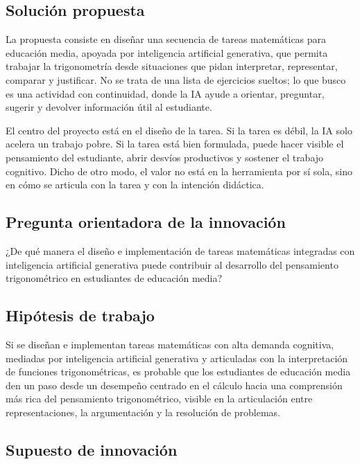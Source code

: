 \documentclass[11pt,spanish,letterpaper,openany]{book}
\begin{document}
\subsection{Solución propuesta}

La propuesta consiste en diseñar una secuencia de tareas matemáticas para educación media, apoyada por inteligencia artificial generativa, que permita trabajar la trigonometría desde situaciones que pidan interpretar, representar, comparar y justificar. No se trata de una lista de ejercicios sueltos; lo que busco es una actividad con continuidad, donde la IA ayude a orientar, preguntar, sugerir y devolver información útil al estudiante.

El centro del proyecto está en el diseño de la tarea. Si la tarea es débil, la IA solo acelera un trabajo pobre. Si la tarea está bien formulada, puede hacer visible el pensamiento del estudiante, abrir desvíos productivos y sostener el trabajo cognitivo. Dicho de otro modo, el valor no está en la herramienta por sí sola, sino en cómo se articula con la tarea y con la intención didáctica.

\subsection{Pregunta orientadora de la innovación}

¿De qué manera el diseño e implementación de tareas matemáticas integradas con inteligencia artificial generativa puede contribuir al desarrollo del pensamiento trigonométrico en estudiantes de educación media?

\subsection{Hipótesis de trabajo}

Si se diseñan e implementan tareas matemáticas con alta demanda cognitiva, mediadas por inteligencia artificial generativa y articuladas con la interpretación de funciones trigonométricas, es probable que los estudiantes de educación media den un paso desde un desempeño centrado en el cálculo hacia una comprensión más rica del pensamiento trigonométrico, visible en la articulación entre representaciones, la argumentación y la resolución de problemas.

\subsection{Supuesto de innovación}
\end{document}

